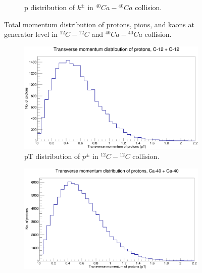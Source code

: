 \documentclass[12pt, twocolumn]{article}
\begin{document}
\begin{figure}[h]
\begin{subfigure}[h]{0.49\textwidth}
\caption{p distribution of $k^{\pm}$ in $^{40}Ca-{^{40}Ca}$ collision.}
\label{Generator - Total momentum distribution of kaons Ca40.}
\end{subfigure}
\caption{Total momentum distribution of protons, pions, and kaons at generator level in $^{12}C-{^{12}C}$ and $^{40}Ca-{^{40}Ca}$ collision.}
\label{Total momentum distribution of protons, pions, and kaons at generator level in C12-C12 and Ca-Ca40 collision.}
\end{figure}

\clearpage

\begin{figure}[h]
\centering
\begin{subfigure}[h]{0.49\textwidth}
\centering
\includegraphics[scale=0.14]{pT_protons_C12.png}
\caption{pT distribution of $p^{\pm}$ in $^{12}C-{^{12}C}$ collision.}
\label{Generator - Transverse momentum distribution of protons C12.}
\end{subfigure}
\hfill
\vspace*{1cm}
\begin{subfigure}[h]{0.49\textwidth}
\centering
\includegraphics[scale=0.14]{pT_protons_Ca.png}

\end{subfigure}
\end{figure}
\end{document}
